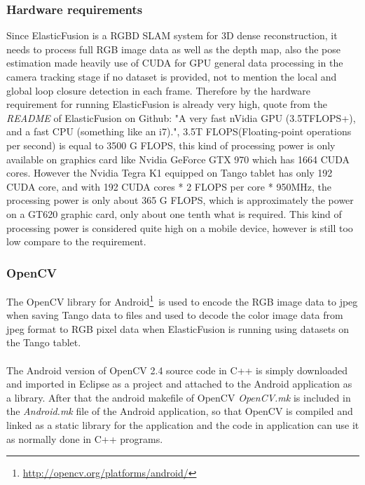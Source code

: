 \documentclass[12pt,twoside]{article}
\begin{document}
\subsubsection{Hardware requirements}
Since ElasticFusion is a RGBD SLAM system for 3D dense reconstruction, it needs to process full RGB image data as well as the depth map, also the pose estimation made heavily use of CUDA for GPU general data processing in the camera tracking stage if no dataset is provided, not to mention the local and global loop closure detection in each frame. Therefore by the hardware requirement for running ElasticFusion is already very high, quote from the \textit{README} of ElasticFusion on Github: "A very fast nVidia GPU (3.5TFLOPS+), and a fast CPU (something like an i7).", 3.5T FLOPS(Floating-point operations per second) is equal to 3500 G FLOPS, this kind of processing power is only available on graphics card like Nvidia GeForce GTX 970 which has 1664 CUDA cores. However the Nvidia Tegra K1 equipped on Tango tablet has only 192 CUDA core, and with 192 CUDA cores * 2 FLOPS per core * 950MHz, the processing power is only about 365 G FLOPS, which is approximately the power on a GT620 graphic card, only about one tenth what is required. This kind of processing power is considered quite high on a mobile device, however is still too low compare to the requirement.\\


\subsubsection{OpenCV}
The OpenCV library for Android\footnote{\url{http://opencv.org/platforms/android/}}\ is used to encode the RGB image data to jpeg when saving Tango data to files and used to decode the color image data from jpeg format to RGB pixel data when ElasticFusion is running using datasets on the Tango tablet.\\
\\
The Android version of OpenCV 2.4 source code in C++ is simply downloaded and imported in Eclipse as a project and attached to the Android application as a library. After that the android makefile of OpenCV \textit{OpenCV.mk} is included in the \textit{Android.mk} file of the Android application, so that OpenCV is compiled and linked as a static library for the application and the code in application can use it as normally done in C++ programs.\\
\end{document}
